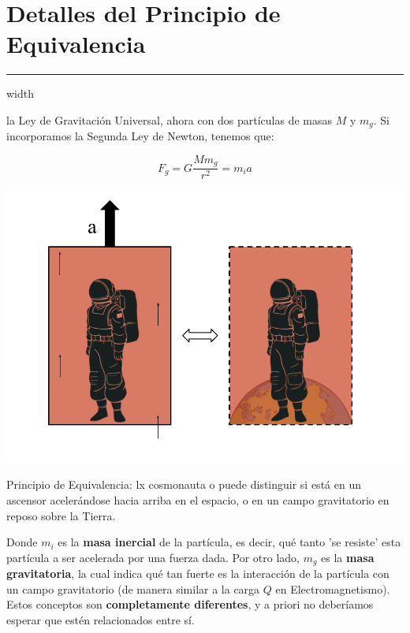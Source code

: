 \newpage

\section{\huge{Detalles del Principio de Equivalencia}}
\textcolor{myred}{\hrule width\textwidth}

 la Ley de Gravitación Universal, ahora con dos partículas de masas $M$ y $m_g$. Si incorporamos la Segunda Ley de Newton, tenemos que:

\begin{equation}
    F_g=G\frac{Mm_g}{r^2}=m_i a
\end{equation}

\begin{marginfigure}
\captionsetup{type=figure}
    \centering
    \includegraphics[width=1.3\textwidth]{Im/equiv.png}
    \caption{Principio de Equivalencia: lx cosmonauta o puede distinguir si está en un ascensor acelerándose hacia arriba en el espacio, o en un campo gravitatorio en reposo sobre la Tierra.}
    \label{fig:sen}
\end{marginfigure}

Donde $m_i$ es la \textbf{masa inercial} de la partícula, es decir, qué tanto 'se resiste' esta partícula a ser acelerada por una fuerza dada. Por otro lado, $m_g$ es la \textbf{masa gravitatoria}, la cual indica qué tan fuerte es la interacción de la partícula con un campo gravitatorio (de manera similar a la carga $Q$ en Electromagnetismo). Estos conceptos son \textbf{completamente diferentes}, y a priori no deberíamos esperar que estén relacionados entre sí\cite[][p.2]{moore}.

